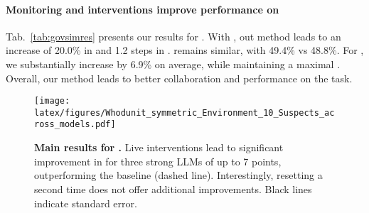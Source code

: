 \paragraph{Monitoring and interventions improve performance on \govsim{}}
Tab.~\ref{tab:govsimres} presents our results for \govsim{}. With \qwenlarge{}, out method leads to an increase of 20.0\% in \survivalrate{} and 1.2 steps in \survivaltime. \efficiency{} remains similar, with 49.4\% vs 48.8\%. 
For \gpt{}, we substantially increase \efficiency{} by 6.9\% on average, while maintaining a maximal \survivalrate{}. Overall, our method leads to better collaboration and performance on the task.


\begin{figure}[t]
    \centering
        \texttt{[image: latex/figures/Whodunit\_symmetric\_Environment\_10\_Suspects\_across\_models.pdf]}
        \caption{\textbf{Main results for \ourenvsym{}.} Live interventions lead to significant improvement in \success{} for three strong LLMs of up to 7 points, outperforming the baseline (dashed line). Interestingly, resetting a second time does not offer additional improvements. Black lines indicate standard error.}
        \label{fig:symmetric-env-results}
\end{figure}


\begin{table}[t]
\centering
\setlength\tabcolsep{3.2pt}
\footnotesize
{}
  \caption{\textbf{Main results for \govsim{}.} 
  Interventions lead to significant gains in \survivalrate{} and \survivaltime{} with \qwenlarge{} and in \efficiency{} with \gpt{}. Numbers include 95\% confidence intervals.}
  \label{tab:govsimres}
\end{table}

